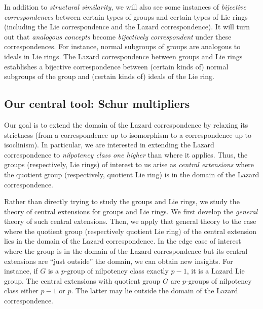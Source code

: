 In addition to {\em structural similarity}, we will also see some
instances of {\em bijective correspondences} between certain types of
groups and certain types of Lie rings (including the Lie
correspondence and the Lazard correspondence). It will turn out that
{\em analogous concepts} become {\em bijectively correspondent} under
these correspondences. For instance, normal subgroups of groups are
analogous to ideals in Lie rings. The Lazard correspondence between
groups and Lie rings establishes a bijective correspondence between
(certain kinds of) normal subgroups of the group and (certain kinds
of) ideals of the Lie ring.

\subsection{Our central tool: Schur multipliers}

Our goal is to extend the domain of the Lazard correspondence by
relaxing its strictness (from a correspondence up to isomorphism to a
correspondence up to isoclinism). In particular, we are interested in
extending the Lazard correspondence to {\em nilpotency class one
  higher} than where it applies. Thus, the groups
(respectively, Lie rings) of interest to us arise as {\em central
  extensions} where the quotient group (respectively, quotient Lie
ring) is in the domain of the Lazard correspondence.

Rather than directly trying to study the groups and Lie rings, we
study the theory of central extensions for groups and Lie rings. We
first develop the {\em general} theory of such central
extensions. Then, we apply that general theory to the case where the
quotient group (respectively quotient Lie ring) of the central
extension lies in the domain of the Lazard correspondence. In the edge
case of interest where the group is in the domain of the Lazard
correspondence but its central extensions are ``just outside'' the
domain, we can obtain new insights. For instance, if $G$ is a
$p$-group of nilpotency class exactly $p - 1$, it is a Lazard Lie
group. The central extensions with quotient group $G$ are $p$-groups
of nilpotency class either $p - 1$ or $p$. The latter may lie outside
the domain of the Lazard correspondence.

